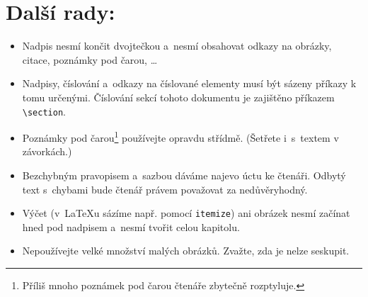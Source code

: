 \documentclass[10pt, twocolumn, a4paper]{article}
\begin{document}
\section{Další rady:}\label{3}
\begin{itemize}
\item Nadpis nesmí končit dvojtečkou a~nesmí obsahovat odkazy na obrázky, citace, poznámky pod čarou, \dots

\item Nadpisy, číslování a~odkazy na číslované elementy musí být sázeny příkazy k tomu určenými.
Číslování sekcí tohoto dokumentu je zajištěno příkazem \verb|\section|.


\item Poznámky pod čarou\footnote{Příliš mnoho poznámek pod čarou čtenáře zbytečně rozptyluje.} používejte opravdu střídmě.
(Šetřete i~s~textem v závorkách.)

\item Bezchybným pravopisem a~sazbou dáváme najevo úctu ke čtenáři.
Odbytý text s~chybami bude čtenář právem považovat za nedůvěryhodný.

\item Výčet (v~\LaTeX{}u sázíme např. pomocí \texttt{itemize}) ani obrázek nesmí začínat hned pod nadpisem a~nesmí tvořit celou kapitolu.

\item Nepoužívejte velké množství malých obrázků.
Zvažte, zda je nelze seskupit.
\end{itemize}
\end{document}
